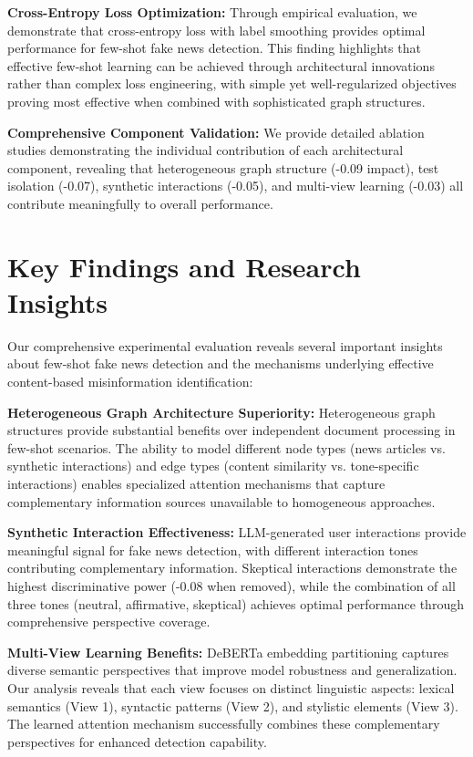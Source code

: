 \textbf{Cross-Entropy Loss Optimization:} Through empirical evaluation, we demonstrate that cross-entropy loss with label smoothing provides optimal performance for few-shot fake news detection. This finding highlights that effective few-shot learning can be achieved through architectural innovations rather than complex loss engineering, with simple yet well-regularized objectives proving most effective when combined with sophisticated graph structures.

\textbf{Comprehensive Component Validation:} We provide detailed ablation studies demonstrating the individual contribution of each architectural component, revealing that heterogeneous graph structure (-0.09 impact), test isolation (-0.07), synthetic interactions (-0.05), and multi-view learning (-0.03) all contribute meaningfully to overall performance.

\section{Key Findings and Research Insights}

Our comprehensive experimental evaluation reveals several important insights about few-shot fake news detection and the mechanisms underlying effective content-based misinformation identification:

\textbf{Heterogeneous Graph Architecture Superiority:} Heterogeneous graph structures provide substantial benefits over independent document processing in few-shot scenarios. The ability to model different node types (news articles vs. synthetic interactions) and edge types (content similarity vs. tone-specific interactions) enables specialized attention mechanisms that capture complementary information sources unavailable to homogeneous approaches.

\textbf{Synthetic Interaction Effectiveness:} LLM-generated user interactions provide meaningful signal for fake news detection, with different interaction tones contributing complementary information. Skeptical interactions demonstrate the highest discriminative power (-0.08 when removed), while the combination of all three tones (neutral, affirmative, skeptical) achieves optimal performance through comprehensive perspective coverage.

\textbf{Multi-View Learning Benefits:} DeBERTa embedding partitioning captures diverse semantic perspectives that improve model robustness and generalization. Our analysis reveals that each view focuses on distinct linguistic aspects: lexical semantics (View 1), syntactic patterns (View 2), and stylistic elements (View 3). The learned attention mechanism successfully combines these complementary perspectives for enhanced detection capability.

